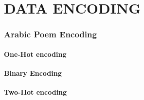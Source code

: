\chapter{\uppercase{Data Encoding}}
\subsection{Arabic Poem Encoding}
\subsubsection{One-Hot encoding}
\subsubsection{Binary Encoding}
\subsubsection{Two-Hot encoding}

